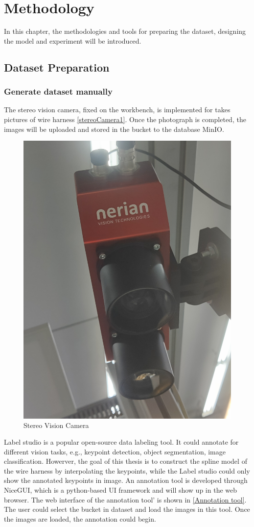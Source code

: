 \chapter{Methodology}
In this chapter, the methodologies and tools for preparing the dataset, designing the model and experiment will be introduced. 
\section{Dataset Preparation}
    \subsection{Generate dataset manually}
    The stereo vision camera, fixed on the workbench, is implemented for takes pictures of wire harness \autoref{stereoCamera1}. Once the photograph is completed, the images will be uploaded and stored 
    in the bucket to the database MinIO.
    \begin{figure}
        \centering
        \includegraphics[width=0.4\linewidth]{example_images/stereoCamera1.jpg}
        \caption{Stereo Vision Camera}
        \label{stereoCamera1}
    \end{figure}
    Label studio\cite{LabelStudio} is a popular open-source data labeling tool. It could annotate for different vision tasks, e.g., keypoint detection, object segmentation, image classification.
    Howerver, the goal of this thesis is to construct the spline model of the wire harness by interpolating the keypoints, while the Label studio could only show the annotated keypoints in image.
    An annotation tool is developed through NiceGUI\cite{schindler2024nicegui}, which is a python-based UI framework and will show up in the web browser. The web interface of the annotation tool'
    is shown in \autoref{Annotation tool}. The user could select the bucket in dataset and load the images in this tool. Once the images are loaded, the annotation could begin.
